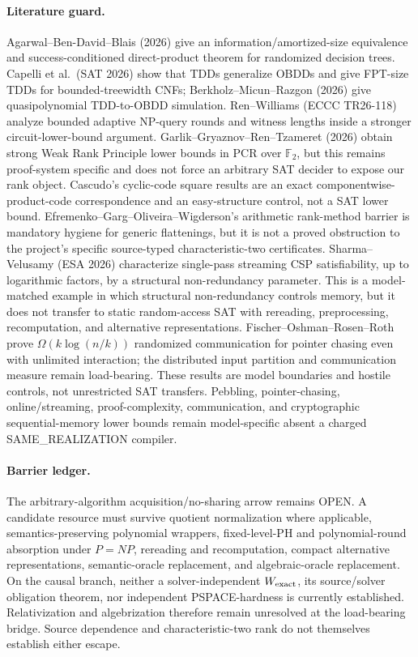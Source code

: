 \documentclass[11pt]{article}
\begin{document}
\paragraph{Literature guard.}
Agarwal--Ben-David--Blais (2026) give an information/amortized-size equivalence and
success-conditioned direct-product theorem for randomized decision trees. Capelli et al.\
(SAT 2026) show that TDDs generalize OBDDs and give FPT-size TDDs for bounded-treewidth
CNFs; Berkholz--Micun--Razgon (2026) give quasipolynomial TDD-to-OBDD simulation.
Ren--Williams (ECCC TR26-118) analyze bounded adaptive NP-query rounds and witness lengths
inside a stronger circuit-lower-bound argument. Garlik--Gryaznov--Ren--Tzameret (2026)
obtain strong Weak Rank Principle lower bounds in PCR over \(\mathbb F_2\), but this remains
proof-system specific and does not force an arbitrary SAT decider to expose our rank object.
Cascudo's cyclic-code square results are an exact componentwise-product-code correspondence
and an easy-structure control, not a SAT lower bound. Efremenko--Garg--Oliveira--Wigderson's
arithmetic rank-method barrier is mandatory hygiene for generic flattenings, but it is not a
proved obstruction to the project's specific source-typed characteristic-two certificates.
Sharma--Velusamy (ESA 2026) characterize single-pass streaming CSP satisfiability,
up to logarithmic factors, by a structural non-redundancy parameter. This is a model-matched
example in which structural non-redundancy controls memory, but it does not transfer to static
random-access SAT with rereading, preprocessing, recomputation, and alternative
representations. Fischer--Oshman--Rosen--Roth prove
\(\Omega(k\log(n/k))\) randomized communication for pointer chasing even with unlimited
interaction; the distributed input partition and communication measure remain load-bearing.
These results are model boundaries and hostile controls, not unrestricted SAT transfers.
Pebbling, pointer-chasing, online/streaming, proof-complexity, communication, and
cryptographic sequential-memory lower bounds remain model-specific absent a charged
SAME\_REALIZATION compiler.

\paragraph{Barrier ledger.}
The arbitrary-algorithm acquisition/no-sharing arrow remains OPEN. A candidate resource must
survive quotient normalization where applicable, semantics-preserving polynomial wrappers,
fixed-level-PH and polynomial-round absorption under \(P=NP\), rereading and recomputation,
compact alternative representations, semantic-oracle replacement, and algebraic-oracle
replacement. On the causal branch, neither a solver-independent \(W_{\rm exact}\), its
source/solver obligation theorem, nor independent PSPACE-hardness is currently established.
Relativization and algebrization therefore remain unresolved at the load-bearing bridge.
Source dependence and characteristic-two rank do not themselves establish either escape.
\end{document}
